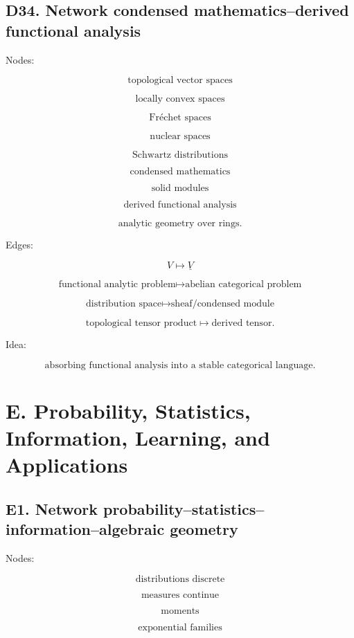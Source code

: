 \documentclass[11pt]{article}
\begin{document}
\subsection{D34. Network condensed mathematics--derived functional analysis}

Nodes:

\[
\text{topological vector spaces}
\]

\[
\text{locally convex spaces}
\]

\[
\text{Fréchet spaces}
\]

\[
\text{nuclear spaces}
\]

\[
\text{Schwartz distributions}
\]

\[
\text{condensed mathematics}
\]

\[
\text{solid modules}
\]

\[
\text{derived functional analysis}
\]

\[
\text{analytic geometry over rings}.
\]

Edges:

\[
V\mapsto \underline V
\]

\[
\text{functional analytic problem}\mapsto \text{abelian categorical problem}
\]

\[
\text{distribution space}\mapsto \text{sheaf/condensed module}
\]

\[
\text{topological tensor product}\mapsto \text{derived tensor}.
\]

Idea:

\[
\text{absorbing functional analysis into a stable categorical language}.
\]



\section{E. Probability, Statistics, Information, Learning, and Applications}



\subsection{E1. Network probability--statistics--information--algebraic geometry}

Nodes:

\[
\text{distributions discrete}
\]

\[
\text{measures continue}
\]

\[
\text{moments}
\]

\[
\text{exponential families}
\]
\end{document}
